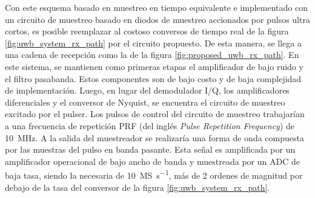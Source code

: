 Con este esquema basado en muestreo en tiempo equivalente e implementado con un
circuito de muestreo basado en diodos de muestreo accionados por pulsos ultra
cortos, es posible reemplazar al costoso conversos de tiempo real de la figura
\ref{fig:uwb_system_rx_path} por el circuito propuesto. De esta manera, se llega
a una cadena de recepción como la de la figura \ref{fig:proposed_uwb_rx_path}.
En este sistema, se mantienen como primeras etapas el amplificador de bajo ruido
y el filtro pasabanda. Estos componentes son de bajo costo y de baja complejidad
de implementación. Luego, en lugar del demodulador I/Q, los amplificadores
diferenciales y el conversor de Nyquist, se encuentra el circuito de muestreo
excitado por el pulser. Los pulsos de control del circuito de muestreo
trabajarían a una frecuencia de repetición PRF (del inglés \textit{Pulse
Repetition Frequency}) de \qty{10}{\mega\hertz}. A la salida del muestreador se
realizaría una forma de onda compuesta por las muestras del pulso en banda
pasante. Esta señal es amplificada por un amplificador operacional de bajo ancho
de banda y muestreada por un ADC de baja tasa, siendo la necesaria de
\qty[per-mode=symbol]{10}{\mega\siemens\per\second}, más de 2 ordenes de
magnitud por debajo de la tasa del conversor de la figura
\ref{fig:uwb_system_rx_path}.

